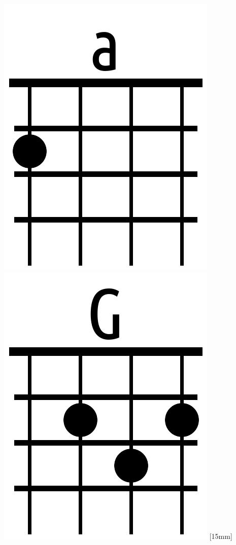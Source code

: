 \documentclass[twoside]{article}
\begin{document}
{	\includegraphics[width=\marginparwidth]{chords/a.png}
	\includegraphics[width=\marginparwidth]{chords/G.png}
}[15mm]
\end{document}
